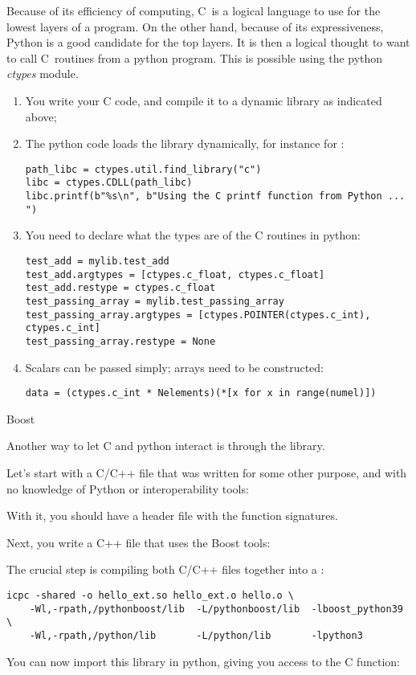 Because of its efficiency of computing, C~is a logical language to use
for the lowest layers of a program. On the other hand, because of its
expressiveness, Python is a good candidate for the top layers. It is
then a logical thought to want to call C~routines from a python
program.
%
This is possible using the python \emph{ctypes}
module.
\begin{enumerate}
\item You write your C code, and compile it to a dynamic library as
  indicated above;
\item The python code loads the library dynamically, for instance for
  :
\begin{verbatim}
path_libc = ctypes.util.find_library("c")
libc = ctypes.CDLL(path_libc)
libc.printf(b"%s\n", b"Using the C printf function from Python ... ")
\end{verbatim}
\item You need to declare what the types are of the C routines in python:
\begin{verbatim}
test_add = mylib.test_add
test_add.argtypes = [ctypes.c_float, ctypes.c_float]
test_add.restype = ctypes.c_float
test_passing_array = mylib.test_passing_array
test_passing_array.argtypes = [ctypes.POINTER(ctypes.c_int), ctypes.c_int]
test_passing_array.restype = None
\end{verbatim}
\item Scalars can be passed simply; arrays need to be constructed:
\begin{verbatim}
data = (ctypes.c_int * Nelements)(*[x for x in range(numel)])
\end{verbatim}
\end{enumerate}

 {Boost}

Another way to let C and python interact is through the  library.

Let's start with a C/C++ file that was written for some other purpose,
and with no knowledge of Python or interoperability tools:
%

%
With it, you should have a  header file with
the function signatures.

Next, you write a C++ file that uses the Boost tools:
%


The crucial step is compiling both C/C++ files together
into a :
\begin{verbatim}
icpc -shared -o hello_ext.so hello_ext.o hello.o \
    -Wl,-rpath,/pythonboost/lib  -L/pythonboost/lib  -lboost_python39 \
    -Wl,-rpath,/python/lib       -L/python/lib       -lpython3
\end{verbatim}

You can now import this library in python,
giving you access to the C function:
%





